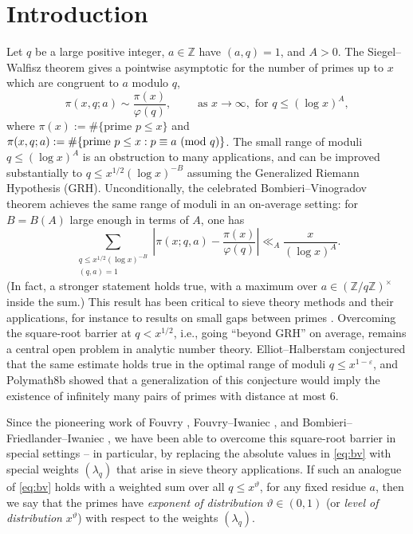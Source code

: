 \documentclass[reqno,11pt]{amsart}
\theoremstyle{remark}
\numberwithin{equation}{section}
\newcommand{\Z}{\mathbb{Z}}
\newcommand{\eps}{\varepsilon}
\renewcommand{\pmod}[1]{\ (\textnormal{mod } #1)}
\begin{document}
\section{Introduction} \label{sec:intro}
Let $q$ be a large positive integer, $a \in \Z$ have $(a, q) = 1$, and $A > 0$. The Siegel--Walfisz theorem gives a pointwise asymptotic for the number of primes up to $x$ which are congruent to $a$ modulo $q$,
\[
    \pi(x, q; a) \sim \frac{\pi(x)}{\varphi(q)}, \qquad \text{ as } x \to \infty, \text{ for } q \le (\log x)^A,
\] 
where $\pi(x) := \#\{\text{prime } p \le x\}$ and $\pi(x, q; a) := \#\{\text{prime } p \le x : p \equiv a \pmod{q}\}$. The small range of moduli $q \le (\log x)^A$ is an obstruction to many applications, and can be improved substantially to $q \le x^{1/2}(\log x)^{-B}$ assuming the Generalized Riemann Hypothesis (GRH).
Unconditionally, the celebrated Bombieri--Vinogradov theorem \cite{bombieri1965large,vinogradov1965density} achieves the same range of moduli in an on-average setting: for $B = B(A)$ large enough in terms of $A$, one has
\begin{equation} \label{eq:bv}
    \sum_{\substack{q \le x^{1/2}(\log x)^{-B} \\ (q, a) = 1}} 
    \left\vert \pi(x; q, a) - \frac{\pi(x)}{\varphi(q)}\right\vert \ll_A
    \frac{x}{(\log x)^A}.
\end{equation}
(In fact, a stronger statement holds true, with a maximum over $a \in (\Z/q\Z)^\times$ inside the sum.)
This result has been critical to sieve theory methods and their applications, for instance to results on small gaps between primes \cite{maynard2015small,polymath2014variants}. Overcoming the square-root barrier at $q < x^{1/2}$, i.e., going ``beyond GRH'' on average, remains a central open problem in analytic number theory. Elliot--Halberstam \cite{elliott1968conjecture} conjectured that the same estimate holds true in the optimal range of moduli $q \le x^{1-\eps}$, and Polymath8b \cite{polymath2014variants} showed that a generalization of this conjecture would imply the existence of infinitely many pairs of primes with distance at most $6$.

Since the pioneering work of Fouvry \cite{fouvry1984autour,fouvry1987autour,fouvry1985probleme,fouvry1982repartition}, Fouvry--Iwaniec \cite{fouvry1980theorem,fouvry1983primes}, and Bombieri--Friedlander--Iwaniec \cite{bombieri1986primes,bombieri1987primes2,bombieri1989primes3}, we have been able to overcome this square-root barrier in special settings \cite{zhang2014bounded,maynard2025primes,maynard2025primes2,maynard2025primes3,stadlmann2023primes} -- in particular, by replacing the absolute values in \cref{eq:bv} with special weights $(\lambda_q)$ that arise in sieve theory applications. If such an analogue of \cref{eq:bv} holds with a weighted sum over all $q \le x^\vartheta$, for any fixed residue $a$, then we say that the primes have \emph{exponent of distribution} $\vartheta \in (0, 1)$ (or \emph{level of distribution} $x^\vartheta$) with respect to the weights $(\lambda_q)$.
\end{document}
